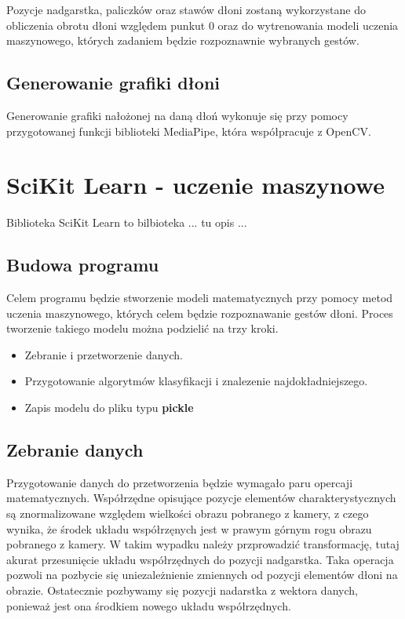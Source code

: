 \quad Pozycje nadgarstka, paliczków oraz stawów dłoni zostaną wykorzystane do obliczenia obrotu dłoni względem punkut 0 oraz do wytrenowania modeli uczenia maszynowego, których zadaniem będzie rozpoznawnie wybranych gestów. 

\subsection{Generowanie grafiki dłoni}

\quad Generowanie grafiki nałożonej na daną dłoń wykonuje się przy pomocy przygotowanej funkcji biblioteki MediaPipe, która współpracuje z OpenCV. 



\section{SciKit Learn - uczenie maszynowe}

\quad Biblioteka SciKit Learn to bilbioteka ... tu opis ... 

\subsection{Budowa programu}
Celem programu będzie stworzenie modeli matematycznych przy pomocy metod uczenia maszynowego, których celem będzie rozpoznawanie gestów dłoni. Proces tworzenie takiego modelu można podzielić na trzy kroki.

\begin{itemize}
    \item Zebranie i przetworzenie danych. 
    \item Przygotowanie algorytmów klasyfikacji i znalezenie najdokładniejszego. 
    \item Zapis modelu do pliku typu \textbf{pickle}
\end{itemize}

\subsection{Zebranie danych}

\quad Przygotowanie danych do przetworzenia będzie wymagało paru opercaji matematycznych. Współrzędne opisujące pozycje elementów charakterystycznych są znormalizowane względem wielkości obrazu pobranego z kamery, z czego wynika, że środek układu współrzęnych jest w prawym górnym rogu obrazu pobranego z kamery. W takim wypadku należy przprowadzić transformację, tutaj akurat przesunięcie układu współrzędnych do pozycji nadgarstka. Taka operacja pozwoli na pozbycie się uniezależnienie zmiennych od pozycji elementów dłoni na obrazie. Ostatecznie pozbywamy się pozycji nadarstka z wektora danych, ponieważ jest ona środkiem nowego układu współrzędnych. 

